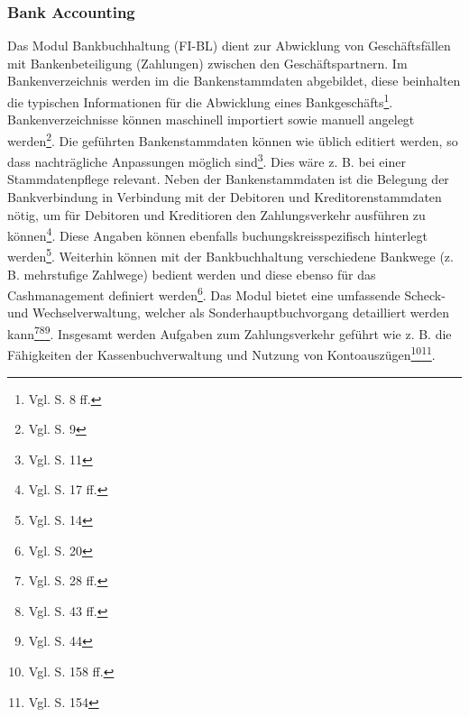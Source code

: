 \subsubsection{Bank Accounting} 
Das Modul Bankbuchhaltung (FI-BL) dient zur Abwicklung von Geschäftsfällen mit Bankenbeteiligung (Zahlungen) zwischen den Geschäftspartnern. 
Im Bankenverzeichnis werden im die Bankenstammdaten abgebildet, diese beinhalten die typischen Informationen für die Abwicklung eines Bankgeschäfts\footnote{Vgl. \cite{SAPFIBL2001} S. 8 ff.}. Bankenverzeichnisse können maschinell importiert sowie manuell angelegt werden\footnote{Vgl. \cite{SAPFIBL2001} S. 9}. Die geführten Bankenstammdaten können wie üblich editiert werden, so dass nachträgliche Anpassungen möglich sind\footnote{Vgl. \cite{SAPFIBL2001} S. 11}. Dies wäre z. B. bei einer Stammdatenpflege relevant. Neben der Bankenstammdaten ist die Belegung der Bankverbindung in Verbindung mit der Debitoren und Kreditorenstammdaten nötig, um für Debitoren und Kreditioren den Zahlungsverkehr ausführen zu können\footnote{Vgl. \cite{SAPFIBL2001} S. 17 ff.}. Diese Angaben können ebenfalls buchungskreisspezifisch hinterlegt werden\footnote{Vgl. \cite{SAPFIBL2001} S. 14}. 
Weiterhin können mit der Bankbuchhaltung verschiedene Bankwege (z. B. mehrstufige Zahlwege) bedient werden und diese ebenso für das Cashmanagement definiert werden\footnote{Vgl. \cite{SAPFIBL2001} S. 20}. Das Modul bietet eine umfassende Scheck- und Wechselverwaltung, welcher als Sonderhauptbuchvorgang detailliert werden kann\footnote{Vgl. \cite{SAPFIBL2001} S. 28 ff.}\footnote{Vgl. \cite{SAPFIBL2001} S. 43 ff.}\footnote{Vgl. \cite{SAPFIBL2001} S. 44}. Insgesamt werden Aufgaben zum Zahlungsverkehr geführt wie z. B. die Fähigkeiten der Kassenbuchverwaltung und  Nutzung von Kontoauszügen\footnote{Vgl. \cite{SAPFIBL2001} S. 158 ff.}\footnote{Vgl. \cite{SAPFIBL2001} S. 154}.

